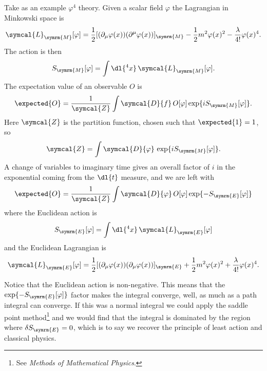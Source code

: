 \documentclass[fleqn]{NotesClass}
\newcommand*{\course}[1]{\textit{#1}}
\newcommand{\lagrangianDensity}{\symcal{L}}
\newcommand{\DL}[1]{\symcal{D}{#1}}
\newcommand{\minkowski}{\symrm{M}}
\newcommand{\euclidean}{\symrm{E}}
\newcommand{\partitionFunction}{\symcal{Z}}
\begin{document}
    Take as an example \(\varphi^4\) theory.
    Given a scalar field \(\varphi\) the Lagrangian in Minkowski space is
    \begin{equation}
        \lagrangianDensity_{\minkowski}[\varphi] = \frac{1}{2}[(\partial_\mu \varphi(x))(\partial^\mu \varphi(x))]_{\minkowski} - \frac{1}{2}m^2\varphi(x)^2 - \frac{\lambda}{4!}\varphi(x)^4.
    \end{equation}
    The action is then
    \begin{equation}
        S_{\minkowski}[\varphi] = \int \dl{^4x} \, \lagrangianDensity_{\minkowski}[\varphi].
    \end{equation}
    The expectation value of an observable \(O\) is
    \begin{equation}
        \expected{O} = \frac{1}{\partitionFunction} \int \DL{f} \, O[\varphi] \exp\{iS_{\minkowski}[\varphi]\}.
    \end{equation}
    Here \(\partitionFunction\) is the partition function, chosen such that \(\expected{1} = 1\), so
    \begin{equation}
        \partitionFunction = \int \DL{\varphi} \, \exp\{iS_{\minkowski}[\varphi]\}.
    \end{equation}
    A change of variables to imaginary time gives an overall factor of \(i\) in the exponential coming from the \(\dl{t}\) measure, and we are left with
    \begin{equation}
        \expected{O} = \frac{1}{\partitionFunction}\int\DL{\varphi} \, O[\varphi] \exp\{-S_{\euclidean}[\varphi]\}
    \end{equation}
    where the Euclidean action is
    \begin{equation}
        S_{\euclidean}[\varphi] = \int\dl{^4x} \, \lagrangianDensity_{\euclidean}[\varphi]
    \end{equation}
    and the Euclidean Lagrangian is
    \begin{equation}
        \lagrangianDensity_{\euclidean}[\varphi] = \frac{1}{2}[(\partial_\mu \varphi(x))(\partial_\mu \varphi(x))]_{\euclidean} + \frac{1}{2}m^2\varphi(x)^2 + \frac{\lambda}{4!}\varphi(x)^4.
    \end{equation}
    
    Notice that the Euclidean action is non-negative.
    This means that the \(\exp\{-S_{\euclidean}[\varphi]\}\) factor makes the integral converge, well, as much as a path integral can converge.
    If this was a normal integral we could apply the saddle point method\footnote{See \course{Methods of Mathematical Physics}.} and we would find that the integral is dominated by the region where \(\delta S_{\euclidean} = 0\), which is to say we recover the principle of least action and classical physics.
    
\end{document}
